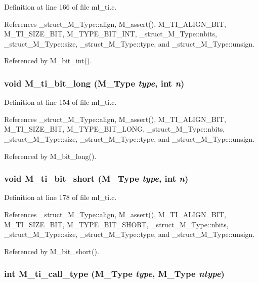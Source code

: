 Definition at line 166 of file ml\_\-ti.c.

References \_\-struct\_\-M\_\-Type::align, M\_\-assert(), M\_\-TI\_\-ALIGN\_\-BIT, M\_\-TI\_\-SIZE\_\-BIT, M\_\-TYPE\_\-BIT\_\-INT, \_\-struct\_\-M\_\-Type::nbits, \_\-struct\_\-M\_\-Type::size, \_\-struct\_\-M\_\-Type::type, and \_\-struct\_\-M\_\-Type::unsign.

Referenced by M\_\-bit\_\-int().
\subsubsection{\setlength{\rightskip}{0pt plus 5cm}void M\_\-ti\_\-bit\_\-long (\bf{M\_\-Type} {\em type}, int {\em n})}\label{ml__ti_8c_0c40eb294d66cd69d1b997e777909bfb}




Definition at line 154 of file ml\_\-ti.c.

References \_\-struct\_\-M\_\-Type::align, M\_\-assert(), M\_\-TI\_\-ALIGN\_\-BIT, M\_\-TI\_\-SIZE\_\-BIT, M\_\-TYPE\_\-BIT\_\-LONG, \_\-struct\_\-M\_\-Type::nbits, \_\-struct\_\-M\_\-Type::size, \_\-struct\_\-M\_\-Type::type, and \_\-struct\_\-M\_\-Type::unsign.

Referenced by M\_\-bit\_\-long().
\subsubsection{\setlength{\rightskip}{0pt plus 5cm}void M\_\-ti\_\-bit\_\-short (\bf{M\_\-Type} {\em type}, int {\em n})}\label{ml__ti_8c_f6e972f8879fedcf0a74ccd8e9d1747f}




Definition at line 178 of file ml\_\-ti.c.

References \_\-struct\_\-M\_\-Type::align, M\_\-assert(), M\_\-TI\_\-ALIGN\_\-BIT, M\_\-TI\_\-SIZE\_\-BIT, M\_\-TYPE\_\-BIT\_\-SHORT, \_\-struct\_\-M\_\-Type::nbits, \_\-struct\_\-M\_\-Type::size, \_\-struct\_\-M\_\-Type::type, and \_\-struct\_\-M\_\-Type::unsign.

Referenced by M\_\-bit\_\-short().
\subsubsection{\setlength{\rightskip}{0pt plus 5cm}int M\_\-ti\_\-call\_\-type (\bf{M\_\-Type} {\em type}, \bf{M\_\-Type} {\em ntype})}\label{ml__ti_8c_152b2d6a90432c022324644c9c3b3fbb}




